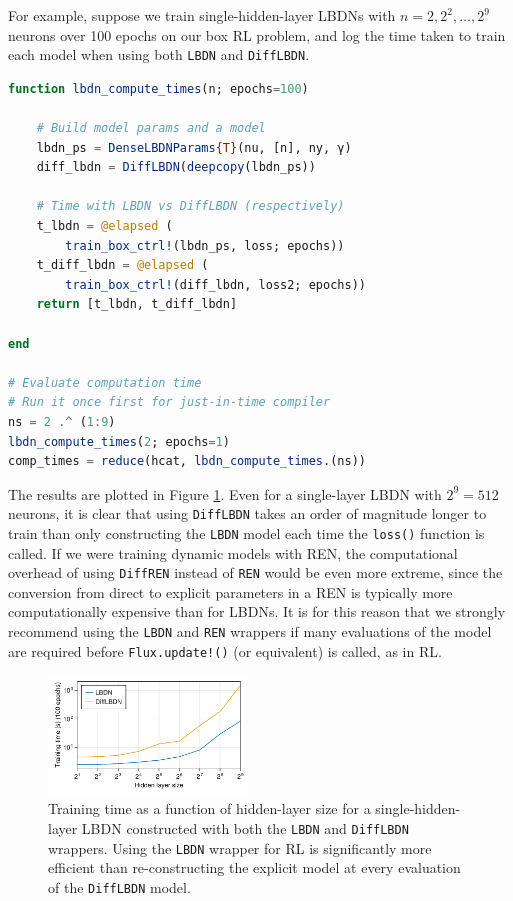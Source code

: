 For example, suppose we train single-hidden-layer LBDNs with $n = 2, 2^2, \ldots, 2^9$ neurons over 100 epochs on our box RL problem, and log the time taken to train each model when using both \verb|LBDN| and \verb|DiffLBDN|.

\begin{lstlisting}[language = Julia]
function lbdn_compute_times(n; epochs=100)

    # Build model params and a model
    lbdn_ps = DenseLBDNParams{T}(nu, [n], ny, γ)
    diff_lbdn = DiffLBDN(deepcopy(lbdn_ps))

    # Time with LBDN vs DiffLBDN (respectively)
    t_lbdn = @elapsed (
        train_box_ctrl!(lbdn_ps, loss; epochs))
    t_diff_lbdn = @elapsed (
        train_box_ctrl!(diff_lbdn, loss2; epochs))
    return [t_lbdn, t_diff_lbdn]

end

# Evaluate computation time
# Run it once first for just-in-time compiler
ns = 2 .^ (1:9)
lbdn_compute_times(2; epochs=1)
comp_times = reduce(hcat, lbdn_compute_times.(ns))
\end{lstlisting}

The results are plotted in Figure \ref{fig:rl-comptime}. Even for a single-layer LBDN with $2^9 = 512$ neurons, it is clear that using \verb|DiffLBDN| takes an order of magnitude longer to train than only constructing the \verb|LBDN| model each time the \verb|loss()| function is called. If we were training dynamic models with REN, the computational overhead of using \verb|DiffREN| instead of \verb|REN| would be even more extreme, since the conversion from direct to explicit parameters in a REN is typically more computationally expensive than for LBDNs. It is for this reason that we strongly recommend using the \verb|LBDN| and \verb|REN| wrappers if many evaluations of the model are required before \verb|Flux.update!()| (or equivalent) is called, as in RL.

\begin{figure}[ht]
    \centering
    \includegraphics[width=0.47\textwidth]{Images/lbdn_rl_comptime.pdf}
    \caption{Training time as a function of hidden-layer size for a single-hidden-layer LBDN constructed with both the \texttt{LBDN} and \texttt{DiffLBDN} wrappers. Using the \texttt{LBDN} wrapper for RL is significantly more efficient than re-constructing the explicit model at every evaluation of the \texttt{DiffLBDN} model.}
    \label{fig:rl-comptime}
\end{figure}